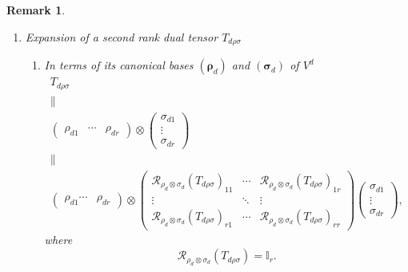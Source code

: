 \documentclass[aps,preprint]{revtex4}
\newtheorem{remark}[theorem]{Remark}
\begin{document}
\begin{remark}
\begin{enumerate}
\item Expansion of a second rank dual tensor $T_{d\rho \sigma }$

\begin{enumerate}
\item In terms of its canonical bases $\left( \boldsymbol{\rho }_{d}\right) $
and $\left( \boldsymbol{\sigma }_{d}\right) $ of $V^{d}$ 
\begin{gather}
T_{d\rho \sigma } \\
\parallel \\
\left( 
\begin{array}{ccc}
\rho _{d1} & \cdots & \rho _{dr}%
\end{array}%
\right) \otimes \left( 
\begin{array}{c}
\sigma _{d1} \\ 
\vdots \\ 
\sigma _{dr}%
\end{array}%
\right) \\
\parallel \\
\left( 
\begin{array}{cc}
\rho _{d1}\cdots & \rho _{dr}%
\end{array}%
\right) \otimes \left( 
\begin{array}{ccc}
\mathcal{R}_{\rho _{d}\otimes \sigma _{d}}\left( T_{d\rho \sigma }\right)
_{11} & \cdots & \mathcal{R}_{\rho _{d}\otimes \sigma _{d}}\left( T_{d\rho
\sigma }\right) _{1r} \\ 
\vdots & \ddots & \vdots \\ 
\mathcal{R}_{\rho _{d}\otimes \sigma _{d}}\left( T_{d\rho \sigma }\right)
_{r1} & \cdots & \mathcal{R}_{\rho _{d}\otimes \sigma _{d}}\left( T_{d\rho
\sigma }\right) _{rr}%
\end{array}%
\right) \left( 
\begin{array}{c}
\sigma _{d1} \\ 
\vdots \\ 
\sigma _{dr}%
\end{array}%
\right) ,
\end{gather}%
where 
\begin{equation}
\mathcal{R}_{\rho _{d}\otimes \sigma _{d}}\left( T_{d\rho \sigma }\right) =%
\mathbb{I}_{r}.
\end{equation}


\end{enumerate}
\end{enumerate}
\end{remark}
\end{document}
